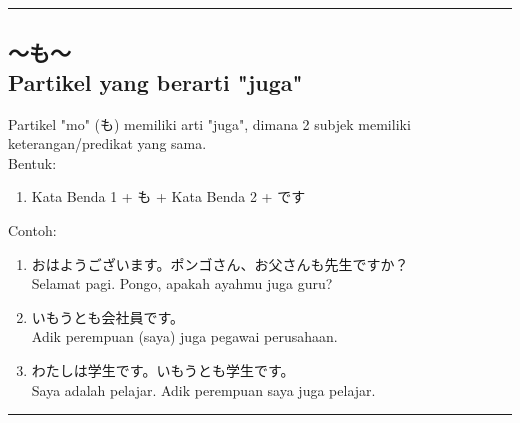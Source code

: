 \vspace{0.2cm}\hrule height 1pt\vspace{0.2cm}


\subsection*{
    ～も～ \\
    Partikel yang berarti "juga"
}
Partikel "mo" (も) memiliki arti "juga", dimana 2 subjek memiliki 
keterangan/predikat yang sama.\\
Bentuk:
\begin{enumerate}
    \item Kata Benda 1 + も + Kata Benda 2 + です
\end{enumerate}
Contoh: 
\begin{enumerate}
    \item おはようございます。ポンゴさん、お父さんも先生ですか？
    \\ Selamat pagi. Pongo, apakah ayahmu juga guru?
    \item いもうとも会社員です。
    \\ Adik perempuan (saya) juga pegawai perusahaan.
    \item わたしは学生です。いもうとも学生です。
    \\ Saya adalah pelajar. Adik perempuan saya juga pelajar.
\end{enumerate}

\vspace{0.2cm}\hrule height 1pt\vspace{0.2cm}

\newpage
